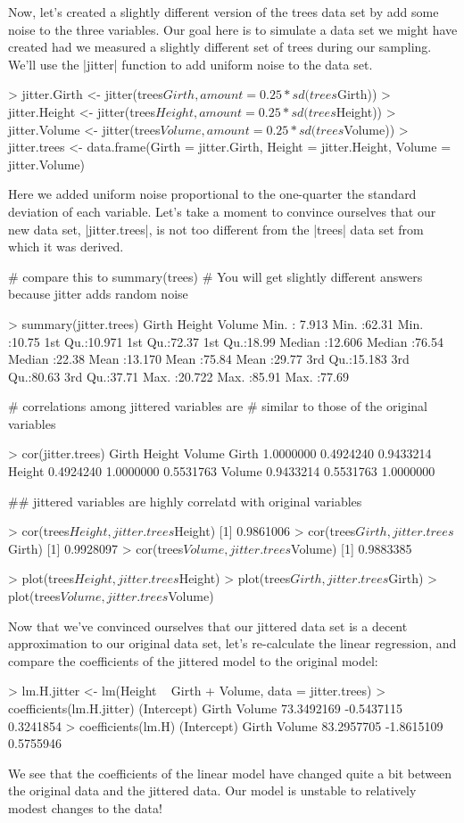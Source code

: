 Now, let's created a slightly different version of the trees data set by add some noise to the three variables.   Our goal here is to simulate a data set we might have created had we measured a slightly different set of trees during our sampling. We'll use the |jitter| function to add uniform noise to the data set.
%
\begin{R}
> jitter.Girth <- jitter(trees$Girth, amount= 0.25 * sd(trees$Girth))
> jitter.Height <- jitter(trees$Height, amount= 0.25 * sd(trees$Height))
> jitter.Volume <- jitter(trees$Volume, amount= 0.25 * sd(trees$Volume))
> jitter.trees <- data.frame(Girth = jitter.Girth, 
                        Height = jitter.Height, 
                        Volume = jitter.Volume)
\end{R}
%
Here we added uniform noise proportional to the one-quarter the standard deviation of each variable.  Let's take a moment to convince ourselves that our new data set, |jitter.trees|, is not too different from the |trees| data set from which it was derived.
%
\begin{R}
# compare this to summary(trees)
# You will get slightly different answers because jitter adds random noise

> summary(jitter.trees)
     Girth            Height          Volume     
 Min.   : 7.913   Min.   :62.31   Min.   :10.75  
 1st Qu.:10.971   1st Qu.:72.37   1st Qu.:18.99  
 Median :12.606   Median :76.54   Median :22.38  
 Mean   :13.170   Mean   :75.84   Mean   :29.77  
 3rd Qu.:15.183   3rd Qu.:80.63   3rd Qu.:37.71  
 Max.   :20.722   Max.   :85.91   Max.   :77.69  

# correlations among jittered variables are
# similar to those of the original variables

> cor(jitter.trees)
           Girth    Height    Volume
Girth  1.0000000 0.4924240 0.9433214
Height 0.4924240 1.0000000 0.5531763
Volume 0.9433214 0.5531763 1.0000000    

## jittered variables are highly correlatd with original variables

> cor(trees$Height, jitter.trees$Height)
[1] 0.9861006
> cor(trees$Girth, jitter.trees$Girth)
[1] 0.9928097
> cor(trees$Volume, jitter.trees$Volume)
[1] 0.9883385

> plot(trees$Height, jitter.trees$Height)
> plot(trees$Girth, jitter.trees$Girth)
> plot(trees$Volume, jitter.trees$Volume)
\end{R}

Now that we've convinced ourselves that our jittered data set is a decent approximation to our original data set, let's re-calculate the linear regression, and compare the coefficients of the jittered model to the original model:
%
\begin{R}
> lm.H.jitter <- lm(Height ~ Girth + Volume, data = jitter.trees)
> coefficients(lm.H.jitter)
(Intercept)       Girth      Volume 
 73.3492169  -0.5437115   0.3241854 
> coefficients(lm.H)
(Intercept)       Girth      Volume 
 83.2957705  -1.8615109   0.5755946 
\end{R}
%
We see that the coefficients of the linear model have changed quite a bit between the original data and the jittered data.  Our model is unstable to relatively modest changes to the data!

